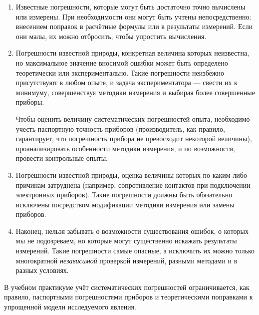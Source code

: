 \begin{enumerate}
    \item Известные погрешности, которые могут быть достаточно точно вычислены
или измерены. При необходимости они могут быть учтены непосредственно:
внесением поправок в расчётные формулы или в результаты измерений.
Если они малы, их можно отбросить, чтобы упростить вычисления.

    \item Погрешности известной природы, конкретная величина которых неизвестна,
но максимальное значение вносимой ошибки может быть определено теоретически
или экспериментально. Такие погрешности неизбежно присутствуют в любом
опыте, и задача экспериментатора --- свести их к минимуму,
совершенствуя методики измерения и выбирая более совершенные приборы.

    Чтобы оценить величину систематических погрешностей опыта, необходимо
учесть паспортную точность приборов (производитель, как правило, гарантирует,
что погрешность прибора не превосходит некоторой величины), проанализировать
особенности методики измерения, и по возможности, провести контрольные
опыты.

    \item Погрешности известной природы, оценка величины которых по каким-либо
причинам затруднена (например, сопротивление контактов при подключении
электронных приборов). Такие погрешности должны быть обязательно исключены
посредством модификации методики измерения или замены приборов.

    \item Наконец, нельзя забывать о возможности существования ошибок, о
которых мы не подозреваем, но которые могут существенно искажать результаты
измерений. Такие погрешности самые опасные, а исключить их можно только
многократной \emph{независимой} проверкой измерений, разными методами
и в разных условиях.
\end{enumerate}

В учебном практикуме учёт систематических погрешностей ограничивается,
как правило, паспортными погрешностями приборов и теоретическими поправками
к упрощенной модели исследуемого явления.

